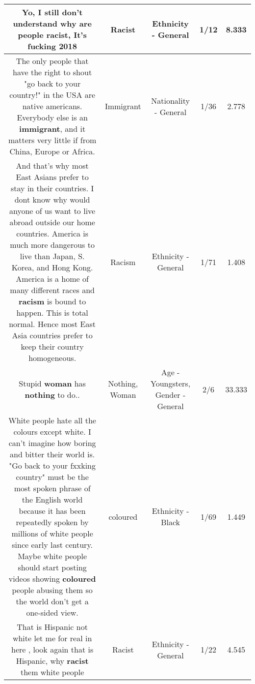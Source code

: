 \documentclass[11pt]{article}
\newlength\mylength
\begin{document}
\begin{center}
\begin{longtable}{|C{.65\mylength}|C{.30\mylength}|C{.12\mylength}|C{.12\mylength}|C{.12\mylength}|}
  \small Yo, I still don't understand why are people \textbf{racist}, It's fucking 2018\normalsize   & Racist & Ethnicity - General & 1/12 & 8.333 \\  \hline
  \small The only people that have the right to shout "go back to your country!" in the USA are native americans. Everybody else is an \textbf{immigrant}, and it matters very little if from China, Europe or Africa.\normalsize   & Immigrant & Nationality - General & 1/36 & 2.778 \\  \hline
  \small And that's why most East Asians prefer to stay in their countries. I dont know why would anyone of us want to live abroad outside our home countries. America is much more dangerous to live than Japan, S. Korea, and Hong Kong. America is a home of many different races and \textbf{racism} is bound to happen. This is total normal. Hence most East Asia countries prefer to keep their country homogeneous.\normalsize   & Racism & Ethnicity - General & 1/71 & 1.408 \\  \hline
  \small Stupid \textbf{woman} has \textbf{nothing} to do..\normalsize   & Nothing, Woman & Age - Youngsters, Gender - General & 2/6 & 33.333 \\  \hline
  \small White people hate all the colours except white. I can't imagine how boring and bitter their world is. "Go back to your fxxking country" must be the most spoken phrase of the English world because it has been repeatedly spoken by millions of white people since early last century. Maybe white people should start posting videos showing \textbf{coloured} people abusing them so the world don't get a one-sided view.\normalsize   & coloured & Ethnicity - Black & 1/69 & 1.449 \\  \hline
  \small That is Hispanic not white let me for real in here , look again that is Hispanic, why \textbf{racist} them white people\normalsize   & Racist & Ethnicity - General & 1/22 & 4.545 \\  \hline

\end{longtable}
\end{center}
\end{document}
